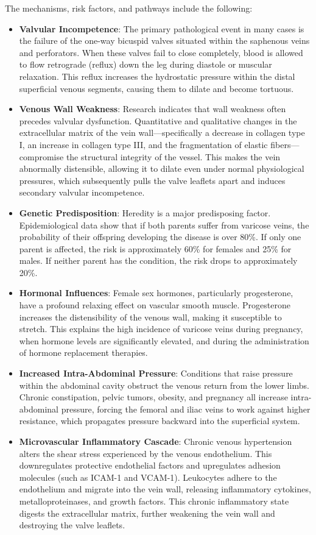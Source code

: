 The mechanisms, risk factors, and pathways include the following:
\begin{itemize}
\item \textbf{Valvular Incompetence}: The primary pathological event in many cases is the failure of the one-way bicuspid valves situated within the saphenous veins and perforators. When these valves fail to close completely, blood is allowed to flow retrograde (reflux) down the leg during diastole or muscular relaxation. This reflux increases the hydrostatic pressure within the distal superficial venous segments, causing them to dilate and become tortuous.
\item \textbf{Venous Wall Weakness}: Research indicates that wall weakness often precedes valvular dysfunction. Quantitative and qualitative changes in the extracellular matrix of the vein wall---specifically a decrease in collagen type I, an increase in collagen type III, and the fragmentation of elastic fibers---compromise the structural integrity of the vessel. This makes the vein abnormally distensible, allowing it to dilate even under normal physiological pressures, which subsequently pulls the valve leaflets apart and induces secondary valvular incompetence.
\item \textbf{Genetic Predisposition}: Heredity is a major predisposing factor. Epidemiological data show that if both parents suffer from varicose veins, the probability of their offspring developing the disease is over 80\%. If only one parent is affected, the risk is approximately 60\% for females and 25\% for males. If neither parent has the condition, the risk drops to approximately 20\%.
\item \textbf{Hormonal Influences}: Female sex hormones, particularly progesterone, have a profound relaxing effect on vascular smooth muscle. Progesterone increases the distensibility of the venous wall, making it susceptible to stretch. This explains the high incidence of varicose veins during pregnancy, when hormone levels are significantly elevated, and during the administration of hormone replacement therapies.
\item \textbf{Increased Intra-Abdominal Pressure}: Conditions that raise pressure within the abdominal cavity obstruct the venous return from the lower limbs. Chronic constipation, pelvic tumors, obesity, and pregnancy all increase intra-abdominal pressure, forcing the femoral and iliac veins to work against higher resistance, which propagates pressure backward into the superficial system.
\item \textbf{Microvascular Inflammatory Cascade}: Chronic venous hypertension alters the shear stress experienced by the venous endothelium. This downregulates protective endothelial factors and upregulates adhesion molecules (such as ICAM-1 and VCAM-1). Leukocytes adhere to the endothelium and migrate into the vein wall, releasing inflammatory cytokines, metalloproteinases, and growth factors. This chronic inflammatory state digests the extracellular matrix, further weakening the vein wall and destroying the valve leaflets.

\end{itemize}
